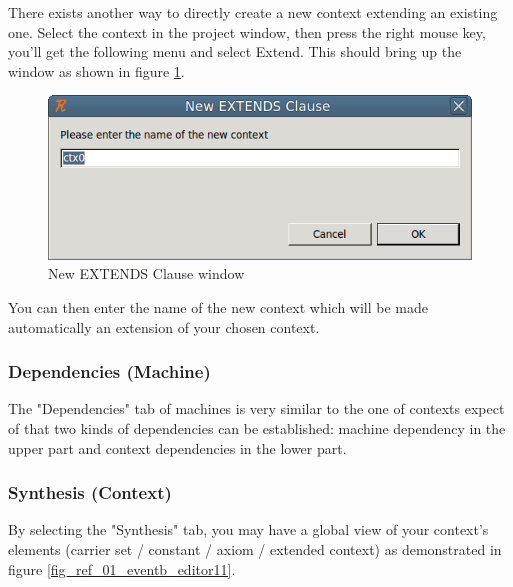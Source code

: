 There exists another way to directly create a new context extending an existing one. Select the context in the project window, then press the right mouse key, you’ll get the following menu and select \textsf{Extend}. This should bring up the window as shown in figure \ref{fig_ref_01_eventb_editor9}.

\begin{figure}[!h]
\begin{center}
	\includegraphics{img/reference/ref_01_eventb_editor9.png}
	\caption{New EXTENDS Clause window}
	\label{fig_ref_01_eventb_editor9}
\end{center}
\end{figure}

You can then enter the name of the new context which will be made automatically an extension of your chosen context. 

\subsubsection{Dependencies (Machine)}

The "Dependencies" tab of machines is very similar to the one of contexts expect of that two kinds of dependencies can be established: machine dependency in the upper part and context dependencies in the lower part.

\subsubsection{Synthesis (Context)}

By selecting the "Synthesis" tab, you may have a global view of your context's elements (carrier set / constant / axiom / extended context) as demonstrated in figure \ref{fig_ref_01_eventb_editor11}. 

